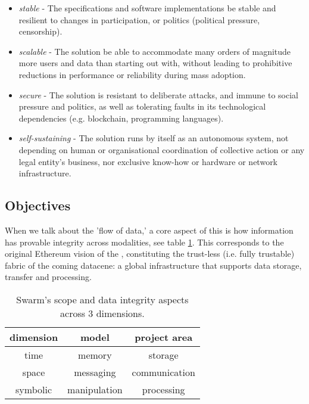 \begin{itemize}
\item \emph{stable} - The specifications and software implementations be stable and resilient to changes in participation, or politics (political pressure, censorship).
\item \emph{scalable} - The solution be able to accommodate many orders of magnitude more users and data than starting out with, without leading to prohibitive reductions in performance or reliability during mass adoption.  
\item \emph{secure} - The solution is resistant to deliberate attacks, and immune to social pressure and politics, as well as tolerating faults in its technological dependencies (e.g. blockchain, programming languages). 
\item \emph{self-sustaining} - The solution runs by itself as an autonomous system, not depending on human or organisational coordination of collective action or any legal entity's business, nor exclusive know-how or hardware or network infrastructure. 
\end{itemize}




\subsection{Objectives \statusyellow}\label{sec:objectives}


When we talk about the 'flow of data,' a core aspect of this is how information has provable integrity across modalities, see table \ref{tab:scope}. This corresponds to the original Ethereum vision of the ,  constituting the trust-less (i.e. fully trustable) fabric of the coming datacene: a global infrastructure that supports data storage, transfer and processing.

\begin{table}[htb]
\centering
\begin{tabular}{c|c|c}
dimension & model & project area\\\hline
%
time & memory & storage \\
space & messaging & communication \\
symbolic & manipulation & processing \\
\end{tabular}
\caption{Swarm's scope and data integrity aspects across 3 dimensions.}
\label{tab:scope}
\end{table}

